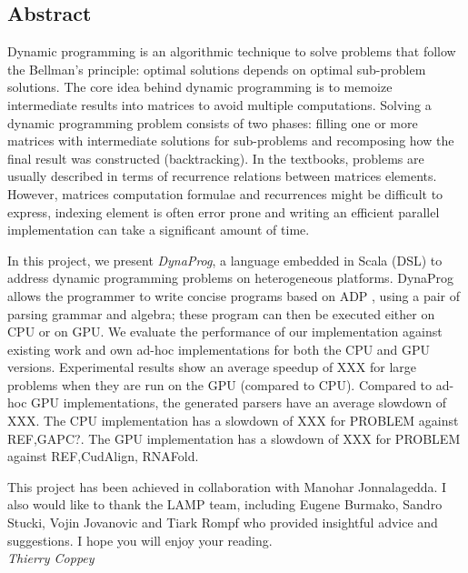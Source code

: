 \subsection*{Abstract}
Dynamic programming is an algorithmic technique to solve problems that follow the Bellman's principle\cite{bellman_principle}: optimal solutions depends on optimal sub-problem solutions. The core idea behind dynamic programming is to memoize intermediate results into matrices to avoid multiple computations. Solving a dynamic programming problem consists of two phases: filling one or more matrices with intermediate solutions for sub-problems and recomposing how the final result was constructed (backtracking). In the textbooks, problems are usually described in terms of recurrence relations between matrices elements. However, matrices computation formulae and recurrences might be difficult to express, indexing element is often error prone and writing an efficient parallel implementation can take a significant amount of time.

In this project, we present \textit{DynaProg}, a language embedded in Scala (DSL) to address dynamic programming problems on heterogeneous platforms. DynaProg allows the programmer to write concise programs based on ADP \cite{adp}, using a pair of parsing grammar and algebra; these program can then be executed either on CPU or on GPU. We evaluate the performance of our implementation against existing work and own ad-hoc implementations for both the CPU and GPU versions. Experimental results show an average speedup of {\color{red} XXX} for large problems when they are run on the GPU (compared to CPU). Compared to ad-hoc GPU implementations, the generated parsers have an average slowdown of {\color{red} XXX}.
The CPU implementation has a slowdown of {\color{red} XXX} for {\color{red} PROBLEM} against {\color{red} REF,GAPC?}.
The GPU implementation has a slowdown of {\color{red} XXX} for {\color{red} PROBLEM} against {\color{red} REF,CudAlign, RNAFold}.

 
\vfill
This project has been achieved in collaboration with Manohar Jonnalagedda. I also would like to thank the LAMP team, including Eugene Burmako, Sandro Stucki, Vojin Jovanovic and Tiark Rompf who provided insightful advice and suggestions. I hope you will enjoy your reading. \vspace{.3cm}\\
\textit{Thierry Coppey}

